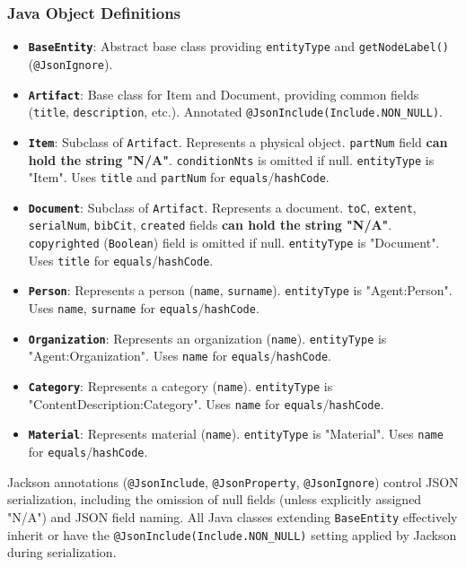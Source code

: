 \subsubsection{Java Object Definitions}
\begin{itemize}
    \item \textbf{\texttt{BaseEntity}}: Abstract base class providing \texttt{entityType} and \texttt{getNodeLabel()} (\texttt{@JsonIgnore}).
    \item \textbf{\texttt{Artifact}}: Base class for Item and Document, providing common fields (\texttt{title}, \texttt{description}, etc.). Annotated \texttt{@JsonInclude(Include.NON\_NULL)}.
    \item \textbf{\texttt{Item}}: Subclass of \texttt{Artifact}. Represents a physical object. \texttt{partNum} field \textbf{can hold the string "N/A"}. \texttt{conditionNts} is omitted if null. \texttt{entityType} is "Item". Uses \texttt{title} and \texttt{partNum} for \texttt{equals}/\texttt{hashCode}.
    \item \textbf{\texttt{Document}}: Subclass of \texttt{Artifact}. Represents a document. \texttt{toC}, \texttt{extent}, \texttt{serialNum}, \texttt{bibCit}, \texttt{created} fields \textbf{can hold the string "N/A"}. \texttt{copyrighted} (\texttt{Boolean}) field is omitted if null. \texttt{entityType} is "Document". Uses \texttt{title} for \texttt{equals}/\texttt{hashCode}.
    \item \textbf{\texttt{Person}}: Represents a person (\texttt{name}, \texttt{surname}). \texttt{entityType} is "Agent:Person". Uses \texttt{name}, \texttt{surname} for \texttt{equals}/\texttt{hashCode}.
    \item \textbf{\texttt{Organization}}: Represents an organization (\texttt{name}). \texttt{entityType} is "Agent:Organization". Uses \texttt{name} for \texttt{equals}/\texttt{hashCode}.
    \item \textbf{\texttt{Category}}: Represents a category (\texttt{name}). \texttt{entityType} is "ContentDescription:Category". Uses \texttt{name} for \texttt{equals}/\texttt{hashCode}.
    \item \textbf{\texttt{Material}}: Represents material (\texttt{name}). \texttt{entityType} is "Material". Uses \texttt{name} for \texttt{equals}/\texttt{hashCode}.
\end{itemize}
Jackson annotations (\texttt{@JsonInclude}, \texttt{@JsonProperty}, \texttt{@JsonIgnore}) control JSON serialization, including the omission of null fields (unless explicitly assigned "N/A") and JSON field naming. All Java classes extending \texttt{BaseEntity} effectively inherit or have the \texttt{@JsonInclude(Include.NON\_NULL)} setting applied by Jackson during serialization.

